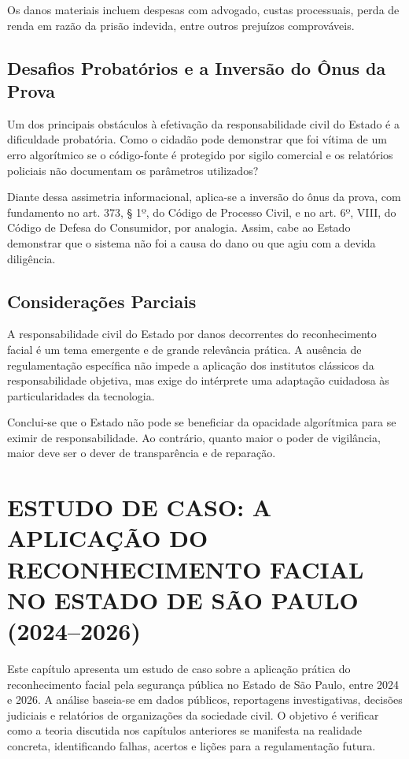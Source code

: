 \documentclass[12pt,a4paper]{article}
\begin{document}
Os danos materiais incluem despesas com advogado, custas processuais, perda de renda em razão da prisão indevida, entre outros prejuízos comprováveis.

\subsection{Desafios Probatórios e a Inversão do Ônus da Prova}

Um dos principais obstáculos à efetivação da responsabilidade civil do Estado é a dificuldade probatória. Como o cidadão pode demonstrar que foi vítima de um erro algorítmico se o código-fonte é protegido por sigilo comercial e os relatórios policiais não documentam os parâmetros utilizados?

Diante dessa assimetria informacional, aplica-se a inversão do ônus da prova, com fundamento no art. 373, § 1º, do Código de Processo Civil, e no art. 6º, VIII, do Código de Defesa do Consumidor, por analogia. Assim, cabe ao Estado demonstrar que o sistema não foi a causa do dano ou que agiu com a devida diligência.

\subsection{Considerações Parciais}

A responsabilidade civil do Estado por danos decorrentes do reconhecimento facial é um tema emergente e de grande relevância prática. A ausência de regulamentação específica não impede a aplicação dos institutos clássicos da responsabilidade objetiva, mas exige do intérprete uma adaptação cuidadosa às particularidades da tecnologia.

Conclui-se que o Estado não pode se beneficiar da opacidade algorítmica para se eximir de responsabilidade. Ao contrário, quanto maior o poder de vigilância, maior deve ser o dever de transparência e de reparação.

\section{ESTUDO DE CASO: A APLICAÇÃO DO RECONHECIMENTO FACIAL NO ESTADO DE SÃO PAULO (2024--2026)}

Este capítulo apresenta um estudo de caso sobre a aplicação prática do reconhecimento facial pela segurança pública no Estado de São Paulo, entre 2024 e 2026. A análise baseia-se em dados públicos, reportagens investigativas, decisões judiciais e relatórios de organizações da sociedade civil. O objetivo é verificar como a teoria discutida nos capítulos anteriores se manifesta na realidade concreta, identificando falhas, acertos e lições para a regulamentação futura.
\end{document}
